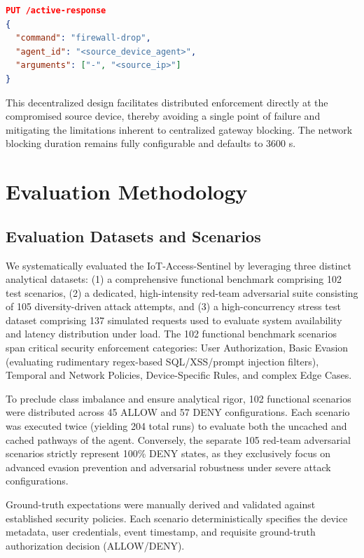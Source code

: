\documentclass[
]{ceurart}
\begin{document}
\begin{lstlisting}[language=json]
PUT /active-response
{
  "command": "firewall-drop",
  "agent_id": "<source_device_agent>",
  "arguments": ["-", "<source_ip>"]
}
\end{lstlisting}

This decentralized design facilitates distributed enforcement directly at the compromised source device, thereby avoiding a single point of failure and mitigating the limitations inherent to centralized gateway blocking. The network blocking duration remains fully configurable and defaults to 3600 s.

\section{Evaluation Methodology}\label{sec:evaluation}

\subsection{Evaluation Datasets and Scenarios}

We systematically evaluated the IoT-Access-Sentinel by leveraging three distinct analytical datasets: (1) a comprehensive functional benchmark comprising 102 test scenarios, (2) a dedicated, high-intensity red-team adversarial suite consisting of 105 diversity-driven attack attempts, and (3) a high-concurrency stress test dataset comprising 137 simulated requests used to evaluate system availability and latency distribution under load. The 102 functional benchmark scenarios span critical security enforcement categories: User Authorization, Basic Evasion (evaluating rudimentary regex-based SQL/XSS/prompt injection filters), Temporal and Network Policies, Device-Specific Rules, and complex Edge Cases.

To preclude class imbalance and ensure analytical rigor, 102 functional scenarios were distributed across 45 ALLOW and 57 DENY configurations. Each scenario was executed twice (yielding 204 total runs) to evaluate both the uncached and cached pathways of the agent. Conversely, the separate 105 red-team adversarial scenarios strictly represent 100\% DENY states, as they exclusively focus on advanced evasion prevention and adversarial robustness under severe attack configurations.

Ground-truth expectations were manually derived and validated against established security policies. Each scenario deterministically specifies the device metadata, user credentials, event timestamp, and requisite ground-truth authorization decision (ALLOW/DENY).
\end{document}
